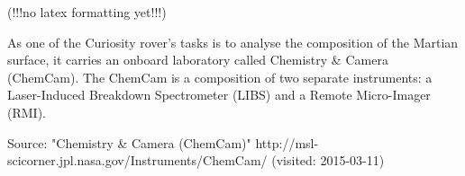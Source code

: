 (!!!no latex formatting yet!!!)

As one of the Curiosity rover's tasks is to analyse the composition of the Martian surface, it carries an onboard laboratory called Chemistry & Camera (ChemCam).
 The ChemCam is a composition of two separate instruments: a Laser-Induced Breakdown Spectrometer (LIBS) and a Remote Micro-Imager (RMI).

Source:
"Chemistry & Camera (ChemCam)"
http://msl-scicorner.jpl.nasa.gov/Instruments/ChemCam/ (visited: 2015-03-11)